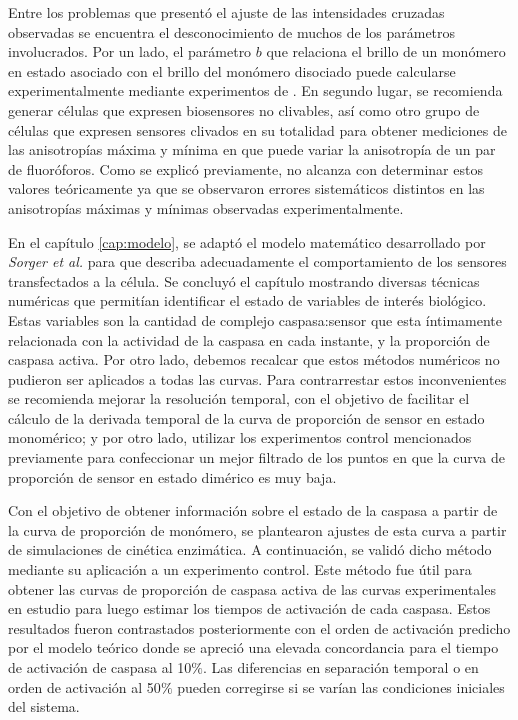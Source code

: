 Entre los problemas que presentó el ajuste de las intensidades cruzadas observadas se encuentra el desconocimiento de muchos de los parámetros involucrados. Por un lado, el parámetro $b$ que relaciona el brillo de un monómero en estado asociado con el brillo del monómero disociado puede calcularse experimentalmente mediante experimentos de . En segundo lugar, se recomienda generar células que expresen biosensores no clivables, así como otro grupo de células que expresen sensores clivados en su totalidad para obtener mediciones de las anisotropías máxima y mínima en que puede variar la anisotropía de un par de fluoróforos. Como se explicó previamente, no alcanza con determinar estos valores teóricamente ya que se observaron errores sistemáticos distintos en las anisotropías máximas y mínimas observadas experimentalmente.

En el capítulo \ref{cap:modelo}, se adaptó el modelo matemático desarrollado por \textit{Sorger et al.}\cite{Sorger2008} para que describa adecuadamente el comportamiento de los sensores transfectados a la célula. Se concluyó el capítulo mostrando diversas técnicas numéricas que permitían identificar el estado de variables de interés biológico. Estas variables son la cantidad de complejo caspasa:sensor que esta íntimamente relacionada con la actividad de la caspasa en cada instante, y la proporción de caspasa activa. Por otro lado, debemos recalcar que estos métodos numéricos no pudieron ser aplicados a todas las curvas. Para contrarrestar estos inconvenientes se recomienda mejorar la resolución temporal, con el objetivo de facilitar el cálculo de la derivada temporal de la curva de proporción de sensor en estado monomérico; y por otro lado, utilizar los experimentos control mencionados previamente para confeccionar un mejor filtrado de los puntos en que la curva de proporción de sensor en estado dimérico es muy baja.

Con el objetivo de obtener información sobre el estado de la caspasa a partir de la curva de proporción de monómero, se plantearon ajustes de esta curva a partir de simulaciones de cinética enzimática. A continuación, se validó dicho método mediante su aplicación a un experimento control. Este método fue útil para obtener las curvas de proporción de caspasa activa de las curvas experimentales en estudio para luego estimar los tiempos de activación de cada caspasa. Estos resultados fueron contrastados posteriormente con el orden de activación predicho por el modelo teórico donde se apreció una elevada concordancia para el tiempo de activación de caspasa al 10$\%$. Las diferencias en separación temporal o en orden de activación al 50$\%$ pueden corregirse si se varían las condiciones iniciales del sistema.


